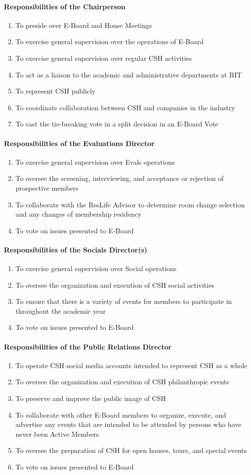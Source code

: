 \documentclass{article}
\newcommand{\asubsubsection}[1]{\paragraph{#1} \label{#1}}
\begin{document}
\asubsubsection{Responsibilities of the Chairperson}
\begin{enumerate}
	\item To preside over E-Board and House Meetings
	\item To exercise general supervision over the operations of E-Board
	\item To exercise general supervision over regular CSH activities
	\item To act as a liaison to the academic and administrative departments at RIT
	\item To represent CSH publicly
	\item To coordinate collaboration between CSH and companies in the industry
	\item To cast the tie-breaking vote in a split decision in an E-Board Vote
\end{enumerate}

\asubsubsection{Responsibilities of the Evaluations Director}
\begin{enumerate}
	\item To exercise general supervision over Evals operations
	\item To oversee the screening, interviewing, and acceptance or rejection of prospective members
	\item To collaborate with the ResLife Advisor to determine room change selection and any changes of membership residency
	\item To vote on issues presented to E-Board
\end{enumerate}

\asubsubsection{Responsibilities of the Socials Director(s)}
\begin{enumerate}
	\item To exercise general supervision over Social operations
	\item To oversee the organization and execution of CSH social activities
	\item To ensure that there is a variety of events for members to participate in throughout the academic year
	\item To vote on issues presented to E-Board
\end{enumerate}

\asubsubsection{Responsibilities of the Public Relations Director}
\begin{enumerate}
	\item To operate CSH social media accounts intended to represent CSH as a whole
	\item To oversee the organization and execution of CSH philanthropic events
	\item To preserve and improve the public image of CSH
	\item To collaborate with other E-Board members to organize, execute, and advertise any events that are intended to be attended by persons who have never been Active Members
	\item To oversee the preparation of CSH for open houses, tours, and special events
	\item To vote on issues presented to E-Board
\end{enumerate}
\end{document}
